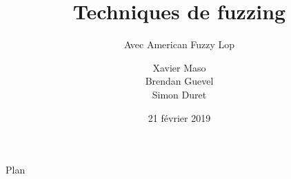 \documentclass{bredelebeamer}
\title[]{Techniques de fuzzing}
\subtitle{Avec American Fuzzy Lop}
\author[Xavier M. - Brendan G. - Simon D.]{Xavier Maso \\ Brendan Guevel \\ Simon Duret}
\institute[]{
  \texttt{[image: ../medias/universite-bordeaux.pdf]}
}
\date{21 février 2019}
\begin{document}
\begin{frame}
  \titlepage
\end{frame}



\begin{frame}{Plan}
  \tableofcontents
\end{frame}




\end{document}
